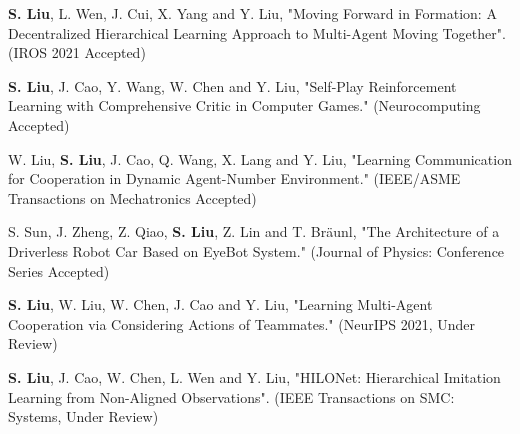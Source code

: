 \begin{itemize}[leftmargin=*]
  {\small

  \item
  \textbf{S. Liu}, L. Wen, J. Cui, X. Yang and Y. Liu, "Moving Forward in Formation: A Decentralized Hierarchical Learning Approach to Multi-Agent Moving Together". (IROS 2021 Accepted)
  \item
  \textbf{S. Liu}, J. Cao, Y. Wang, W. Chen and Y. Liu, "Self-Play Reinforcement Learning with Comprehensive Critic in Computer Games." (Neurocomputing Accepted)
  \item
  W. Liu, \textbf{S. Liu}, J. Cao, Q. Wang, X. Lang and Y. Liu, "Learning Communication for Cooperation in Dynamic Agent-Number Environment." (IEEE/ASME Transactions on Mechatronics Accepted)
  \item 
  S. Sun, J. Zheng, Z. Qiao, \textbf{S. Liu}, Z. Lin and T. Bräunl, "The Architecture of a Driverless Robot Car Based on EyeBot System." (Journal of Physics: Conference Series Accepted)
  \item
  \textbf{S. Liu}, W. Liu, W. Chen, J. Cao and Y. Liu, "Learning Multi-Agent Cooperation via Considering Actions of Teammates." (NeurIPS 2021, Under Review)}
  \item
  \textbf{S. Liu}, J. Cao, W. Chen, L. Wen and Y. Liu, "HILONet: Hierarchical Imitation Learning from Non-Aligned Observations". (IEEE Transactions on SMC: Systems, Under Review)

\end{itemize}